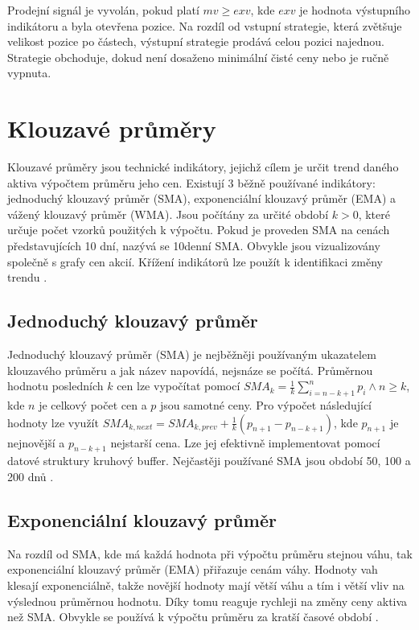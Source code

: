 Prodejní signál je vyvolán, pokud platí $mv\geq exv$, kde $exv$ je hodnota výstupního indikátoru a byla otevřena pozice.
Na rozdíl od vstupní strategie, která zvětšuje velikost pozice po částech, výstupní strategie prodává celou pozici najednou.
Strategie obchoduje, dokud není dosaženo minimální čisté ceny nebo je ručně vypnuta.

\section{Klouzavé průměry}
Klouzavé průměry jsou technické indikátory, jejichž cílem je určit trend daného aktiva výpočtem průměru jeho cen.
Existují 3 běžně používané indikátory: jednoduchý klouzavý průměr (SMA), exponenciální klouzavý průměr (EMA) a vážený klouzavý průměr (WMA).
Jsou počítány za určité období $k>0$, které určuje počet vzorků použitých k výpočtu.
Pokud je proveden SMA na cenách představujících 10 dní, nazývá se 10denní SMA.
Obvykle jsou vizualizovány společně s grafy cen akcií.
Křížení indikátorů lze použít k identifikaci změny trendu  \cite{ma-algorithms}.

\subsection{Jednoduchý klouzavý průměr}
Jednoduchý klouzavý průměr (SMA) je nejběžněji používaným ukazatelem klouzavého průměru a jak název napovídá, nejsnáze se počítá.
Průměrnou hodnotu posledních $k$ cen lze vypočítat pomocí $SMA_k = \frac{1}{k}\sum_{i=n-k+1}^{n} p_i \land n\ge k$, kde $n$ je celkový počet cen a $p$ jsou samotné ceny.
Pro výpočet následující hodnoty lze využít $SMA_{k,next}=SMA_{k,prev}+\frac{1}{k}(p_{n+1}-p_{n-k+1})$, kde $p_{n+1}$ je nejnovější a $p_{n-k+1}$ nejstarší cena.
Lze jej efektivně implementovat pomocí datové struktury kruhový buffer.
Nejčastěji používané SMA jsou období 50, 100 a 200 dnů \cite{ma-algorithms, sma-wiki}.

\subsection{Exponenciální klouzavý průměr}
Na rozdíl od SMA, kde má každá hodnota při výpočtu průměru stejnou váhu, tak exponenciální klouzavý průměr (EMA) přiřazuje cenám váhy.
Hodnoty vah klesají exponenciálně, takže novější hodnoty mají větší váhu a tím i větší vliv na výslednou průměrnou hodnotu.
Díky tomu reaguje rychleji na změny ceny aktiva než SMA.
Obvykle se používá k výpočtu průměru za kratší časové období \cite{ma-algorithms, ema-institute}.

